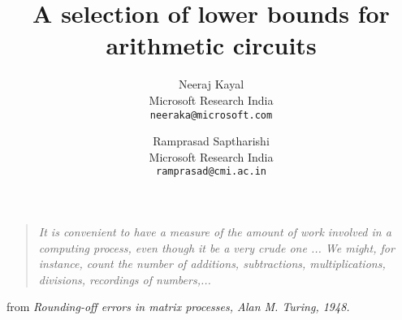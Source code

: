 \documentclass[11pt]{article}
\title{A selection of lower bounds for arithmetic circuits}
\author{Neeraj Kayal\\
\normalsize{Microsoft Research India}\\
\normalsize{\tt{neeraka@microsoft.com}}
\and Ramprasad Saptharishi\\
\normalsize{Microsoft Research India}\\
\normalsize{{\tt ramprasad@cmi.ac.in}}
}
\begin{document}
\maketitle

\begin{minipage}[t]{0.2\textwidth}
  \hfill
  \hfill
\end{minipage}
\begin{minipage}[t]{0.8\textwidth}
  \begin{flushright}
    \begin{quote}
      {\em It is convenient to have a measure of the 
        amount of work involved in a computing process, 
        even though it be a very crude one ... We might, 
        for instance, count the number of additions, 
        subtractions, multiplications, divisions, 
        recordings of numbers,...}
    \end{quote}
  \end{flushright}
  \begin{flushright}
    from \em{Rounding-off errors in matrix processes}, Alan M. Turing, 1948.
  \end{flushright}
\end{minipage}
























\end{document}
